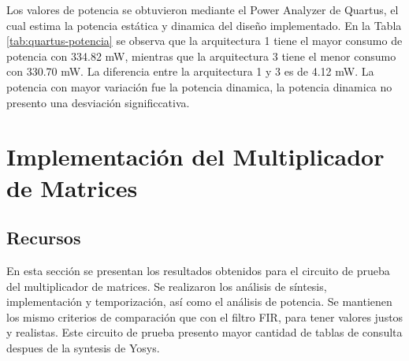 \begin{table}[H]
  \centering
  \caption{Potencia térmica estimada por el analizador de potencia de Quartus para el FIR en cada arquitectura.}
  \label{tab:quartus-potencia}
\end{table}

Los valores de potencia se obtuvieron mediante el Power Analyzer de Quartus\textregistered{}, el cual estima la potencia estática y dinamica del diseño implementado. En la Tabla \ref{tab:quartus-potencia} se observa que la arquitectura 1 tiene el mayor consumo de potencia con 334.82 mW, mientras que la arquitectura 3 tiene el menor consumo con 330.70 mW. La diferencia entre la arquitectura 1 y 3 es de 4.12 mW. La potencia con mayor variación fue la potencia dinamica, la potencia dinamica no presento una desviación significcativa.

\section{Implementación del Multiplicador de Matrices}

\subsection{Recursos}

En esta sección se presentan los resultados obtenidos para el circuito de prueba del multiplicador de matrices. Se realizaron los análisis de síntesis, implementación y temporización, así como el análisis de potencia. Se mantienen los mismo criterios de comparación que con el filtro FIR, para tener valores justos y realistas. Este circuito de prueba presento mayor cantidad de tablas de consulta despues de la syntesis de Yosys.

\begin{table}[H]
  \centering
  \caption{Utilización de recursos de la Cyclone V para el multiplicador de matrices en cada arquitectura.}
  \label{tab:quartus-mm-fitter}
\end{table}

